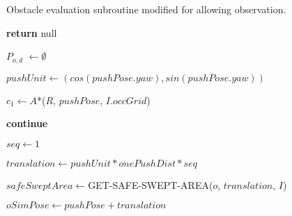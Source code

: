 \begin{algorithm}[H]

  \caption{Obstacle evaluation subroutine modified for allowing observation.}

  \label{alg:04-custom-observation-planforobstacle}

  \begin{algorithmic}[1]


       \label{lst:line:identified_1}
        \State \textbf{return} null
      \EndIf

      \State $P_{o,d}$ $\gets \emptyset$

        \State $pushUnit \gets (cos(pushPose.yaw), sin(pushPose.yaw))$

        \State $c_{1} \gets A$*($R$, $pushPose$, $I.occGrid$) \label{lst:line:c1_computation}

          \State \textbf{continue}
        \EndIf

        \State {}

         \label{lst:line:identified_2}

          \State {} \label{lst:line:keep_c1_1}

            \State {} \label{lst:line:keep_c1_2}
          \Else
            \State {}

             \label{lst:line:noc0c1_1}
              \State {}
            \EndIf \label{lst:line:noc0c1_2}
          \EndIf
        \EndIf

        \State $seq \gets 1$

        \State $translation \gets pushUnit * onePushDist * seq$

        \State $safeSweptArea \gets $GET-SAFE-SWEPT-AREA($o$, $translation$, $I$)

        \State $oSimPose \gets pushPose + translation$


\end{algorithmic}
\end{algorithm}
